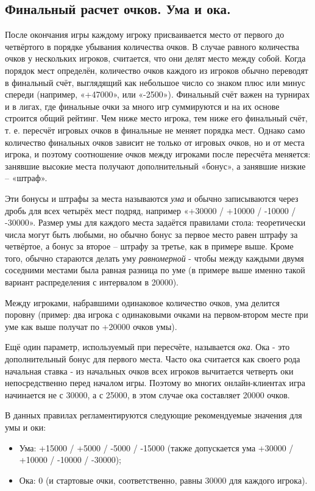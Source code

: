 \subsection{Финальный расчет очков. Ума и ока.}

После окончания игры каждому игроку присваивается место от первого до четвёртого в порядке убывания количества очков. В случае равного количества очков у нескольких игроков, считается, что они делят место между собой. Когда порядок мест определён, количество очков каждого из игроков обычно переводят в финальный счёт, выглядящий как небольшое число со знаком плюс или минус спереди (например, «+47000», или «-2500»). Финальный счёт важен на турнирах и в лигах, где финальные очки за много игр суммируются и на их основе строится общий рейтинг. Чем ниже место игрока, тем ниже его финальный счёт, т. е. пересчёт игровых очков в финальные не меняет порядка мест. Однако само количество финальных очков зависит не только от игровых очков, но и от места игрока, и поэтому соотношение очков между игроками после пересчёта меняется: занявшие высокие места получают дополнительный «бонус», а занявшие низкие – «штраф».

Эти бонусы и штрафы за места называются \textit{ума} и обычно записываются через дробь для всех четырёх мест подряд, например «+30000 / +10000 / -10000 / -30000». Размер умы для каждого места задаётся правилами стола: теоретически числа могут быть любыми, но обычно бонус за первое место равен штрафу за четвёртое, а бонус за второе – штрафу за третье, как в примере выше. Кроме того, обычно стараются делать уму \textit{равномерной} - чтобы между каждыми двумя соседними местами была равная разница по уме (в примере выше именно такой вариант распределения с интервалом в 20000). 

Между игроками, набравшими одинаковое количество очков, ума делится поровну (пример: два игрока с одинаковыми очками на первом-втором месте при уме как выше получат по +20000 очков умы).

Ещё один параметр, используемый при пересчёте, называется \textit{ока}. Ока - это дополнительный бонус для первого места. Часто ока считается как своего рода начальная ставка - из начальных очков всех игроков вычитается четверть оки непосредственно перед началом игры. Поэтому во многих онлайн-клиентах игра начинается не с 30000, а с 25000, в этом случае ока составляет 20000 очков.

В данных правилах регламентируются следующие рекомендуемые значения для умы и оки:
\begin{itemize}
	\item Ума: +15000 / +5000 / -5000 / -15000 (также допускается ума +30000 / +10000 / -10000 / -30000);
	\item Ока: 0 (и стартовые очки, соответственно, равны 30000 для каждого игрока).
\end{itemize}

